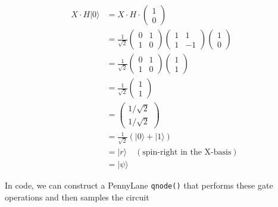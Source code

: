 \documentclass[11pt]{article}
\begin{document}
\begin{align}
  X \cdot H |0\rangle &= X \cdot H \cdot \begin{pmatrix}1 \\ 0\end{pmatrix} \\
  &=  \frac{1}{\sqrt{2}}\begin{pmatrix} 0 & 1 \\ 1 & 0\end{pmatrix} \begin{pmatrix} 1 & 1 \\ 1 & -1\end{pmatrix} \begin{pmatrix}1 \\ 0\end{pmatrix} \\
  &= \frac{1}{\sqrt{2}}\begin{pmatrix} 0 & 1 \\ 1 & 0\end{pmatrix} \begin{pmatrix}1\\1 \end{pmatrix} \\
  &= \frac{1}{\sqrt{2}}\begin{pmatrix}1\\1 \end{pmatrix}\\
  &= \begin{pmatrix}1/\sqrt{2}\\1/\sqrt{2} \end{pmatrix}\\
  &= \frac{1}{\sqrt{2}}(|0\rangle + |1\rangle)\\
  &= |r\rangle \quad (\text{spin-right in the X-basis})\\
  &= |\psi \rangle
\end{align}

    In code, we can construct a PennyLane \texttt{qnode()} that performs
these gate operations and then samples the circuit
\end{document}
